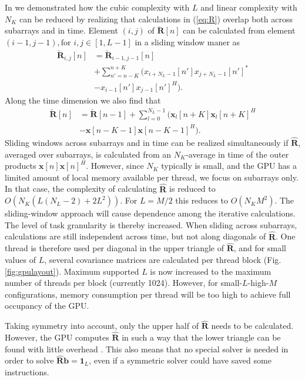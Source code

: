 \documentclass[journal]{IEEEtran}
\newcommand{\mat}[1]{\mathbf{#1}}
\renewcommand{\vec}[1]{\mathbf{#1}}
\begin{document}
In \cite{asen2012, Buskenes} we demonstrated how the cubic complexity with $L$ and linear complexity with $N_K$ can be reduced by realizing that calculations in (\ref{eq:R}) overlap both across subarrays and in time. Element $(i,j)$ of $\mat{\breve{R}}[n]$ can be calculated from element $(i-1, j-1), \text{for } i,j \in [1, L-1]$ in a sliding window maner as
\begin{align}
\mat{\breve{R}}_{i,j}[n] &=  \mat{\breve{R}}_{i-1,j-1}[n]  \nonumber \\
&+ \sum_{n'=n-K}^{n+K} (x_{i+N_L-1}[n']x_{j+N_L-1}[n']^* \nonumber \\
&- x_{i-1}[n']x_{j-1}[n']^H). \label{eq:sliding}
\end{align}
Along the time dimension we also find that
\begin{align}
\mat{\breve{R}}[n] &= \mat{\breve{R}}[n-1] + \sum_{l=0}^{N_L-1} (\vec{x}_l[n+K]\vec{x}_l[n+K]^H \nonumber \\
&- \vec{x}[n-K-1]\vec{x}[n-K-1]^H).
\end{align}
Sliding windows across subarrays and in time can be realized simultaneously if $\mat{\hat{R}}$, averaged over subarrays, is calculated from an $N_K$-average in time of the outer products $\vec{x}[n]\vec{x}[n]^H$. However, since $N_K$ typically is small, and the GPU has a limited amount of local memory available per thread, we focus on subarrays only. In that case, the complexity of calculating $\mat{\hat{R}}$ is reduced to $O(N_K(L(N_L-2)+2L^2))$. For $L=M/2$ this reduces to $O(N_KM^2)$. The sliding-window approach will cause dependence among the iterative calculations. The level of task granularity is thereby increased. When sliding across subarrays, calculations are still independent across time, but not along diagonals of $\mat{\hat{R}}$. One thread is therefore used per diagonal in the upper triangle of $\mat{\hat{R}}$, and for small values of $L$, several covariance matrices are calculated per thread block (Fig. \ref{fig:gpulayout}). Maximum supported $L$ is now increased to the maximum number of threads per block (currently 1024). However, for small-$L$-high-$M$ configurations, memory consumption per thread will be too high to achieve full occupancy of the GPU.

Taking symmetry into account, only the upper half of $\mat{\hat{R}}$ needs to be calculated. However, the GPU computes $\mat{\hat{R}}$ in such a way that the lower triangle can be found with little overhead \cite{Buskenes}. This also means that no special solver is needed in order to solve $\mat{\hat{R}}\vec{b} = \vec{1}_L$, even if a symmetric solver could have saved some instructions.
\end{document}
